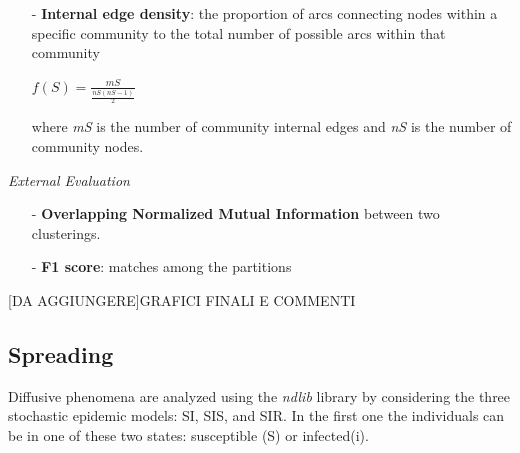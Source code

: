 \documentclass[sigchi]{acmart}
\begin{document}
\begin{itemize}
\item [-]\textbf{Internal edge density}: the proportion of arcs connecting nodes within a specific community to the total number of possible arcs within that community
\vspace{4pt}

\begin{center}

$f(S) = \displaystyle\frac{mS}{\frac{nS(nS-1)}{2}}$
\end{center}

\vspace{5pt}
\begin{flushleft}
where \textit{mS} is the number of community internal edges and \textit{nS} is the number of community nodes.
 \end{flushleft}
  \end{itemize}

\vspace{10pt}

{\fontsize{10}{10}\selectfont \textit{External Evaluation }}
 

\begin{itemize}
  \item [-]\textbf{Overlapping Normalized Mutual Information} between two clusterings.

\vspace{5pt}
\item [-]\textbf{F1 score}: matches among the partitions
\end{itemize}


\begin{table}[htbp]
\centering
\caption{Community detection}
\end{table}

[DA AGGIUNGERE]GRAFICI FINALI E COMMENTI 


\FloatBarrier

\subsection{Spreading}
Diffusive phenomena are analyzed using the \textit{ndlib} \cite{Rossetti_2017} library by considering the three stochastic epidemic models: SI, SIS, and SIR. 
In the first one the individuals can be in one of these two states: susceptible (S) or infected(i).  
\end{document}
